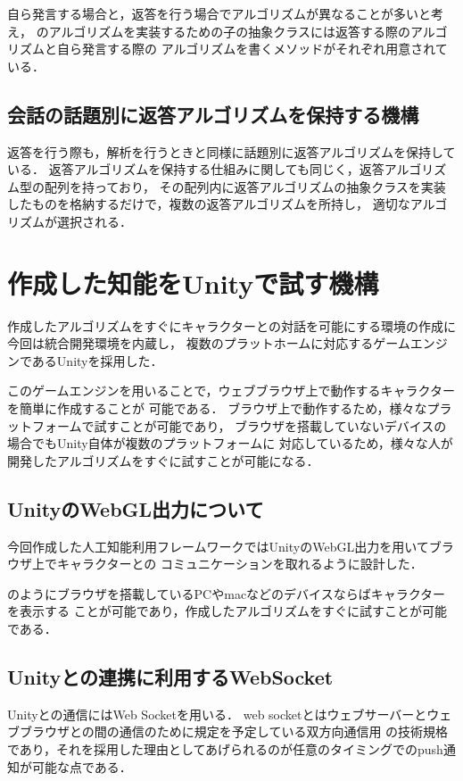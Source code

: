 自ら発言する場合と，返答を行う場合でアルゴリズムが異なることが多いと考え，
のアルゴリズムを実装するための子の抽象クラスには返答する際のアルゴリズムと自ら発言する際の
アルゴリズムを書くメソッドがそれぞれ用意されている．

\subsection{会話の話題別に返答アルゴリズムを保持する機構}
返答を行う際も，解析を行うときと同様に話題別に返答アルゴリズムを保持している．
返答アルゴリズムを保持する仕組みに関しても同じく，返答アルゴリズム型の配列を持っており，
その配列内に返答アルゴリズムの抽象クラスを実装したものを格納するだけで，複数の返答アルゴリズムを所持し，
適切なアルゴリズムが選択される．


\section{作成した知能をUnityで試す機構}
作成したアルゴリズムをすぐにキャラクターとの対話を可能にする環境の作成に今回は統合開発環境を内蔵し，
複数のプラットホームに対応するゲームエンジンであるUnityを採用した．

このゲームエンジンを用いることで，ウェブブラウザ上で動作するキャラクターを簡単に作成することが
可能である．
ブラウザ上で動作するため，様々なプラットフォームで試すことが可能であり，
ブラウザを搭載していないデバイスの場合でもUnity自体が複数のプラットフォームに
対応しているため，様々な人が開発したアルゴリズムをすぐに試すことが可能になる．

\subsection{UnityのWebGL出力について}
今回作成した人工知能利用フレームワークではUnityのWebGL出力を用いてブラウザ上でキャラクターとの
コミュニケーションを取れるように設計した．


のようにブラウザを搭載しているPCやmacなどのデバイスならばキャラクターを表示する
ことが可能であり，作成したアルゴリズムをすぐに試すことが可能である．

\subsection{Unityとの連携に利用するWebSocket}
Unityとの通信にはWeb Socketを用いる．
web socketとはウェブサーバーとウェブブラウザとの間の通信のために規定を予定している双方向通信用
の技術規格であり，それを採用した理由としてあげられるのが任意のタイミングでのpush通知が可能な点である．

